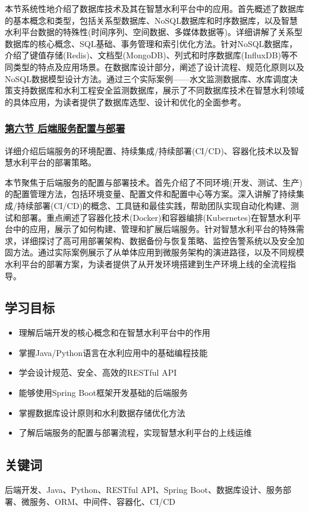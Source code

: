 本节系统性地介绍了数据库技术及其在智慧水利平台中的应用。首先概述了数据库的基本概念和类型，包括关系型数据库、NoSQL数据库和时序数据库，以及智慧水利平台数据的特殊性(时间序列、空间数据、多媒体数据等)。详细讲解了关系型数据库的核心概念、SQL基础、事务管理和索引优化方法。针对NoSQL数据库，介绍了键值存储(Redis)、文档型(MongoDB)、列式和时序数据库(InfluxDB)等不同类型的特点及应用场景。在数据库设计部分，阐述了设计流程、规范化原则以及NoSQL数据模型设计方法。通过三个实际案例------水文监测数据库、水库调度决策支持数据库和水利工程安全监测数据库，展示了不同数据库技术在智慧水利领域的具体应用，为读者提供了数据库选型、设计和优化的全面参考。

\subsubsection{\texorpdfstring{\href{section05-06.md}{第六节
后端服务配置与部署}}{第六节 后端服务配置与部署}}\label{ux7b2cux516dux8282-ux540eux7aefux670dux52a1ux914dux7f6eux4e0eux90e8ux7f72}

详细介绍后端服务的环境配置、持续集成/持续部署(CI/CD)、容器化技术以及智慧水利平台的部署策略。

本节聚焦于后端服务的配置与部署技术。首先介绍了不同环境(开发、测试、生产)的配置管理方法，包括环境变量、配置文件和配置中心等方案。深入讲解了持续集成/持续部署(CI/CD)的概念、工具链和最佳实践，帮助团队实现自动化构建、测试和部署。重点阐述了容器化技术(Docker)和容器编排(Kubernetes)在智慧水利平台中的应用，展示了如何构建、管理和扩展后端服务。针对智慧水利平台的特殊需求，详细探讨了高可用部署架构、数据备份与恢复策略、监控告警系统以及安全加固方法。通过实际案例展示了从单体应用到微服务架构的演进路径，以及不同规模水利平台的部署方案，为读者提供了从开发环境搭建到生产环境上线的全流程指导。

\subsection{学习目标}\label{ux5b66ux4e60ux76eeux6807}

\begin{itemize}
\tightlist
\item
  理解后端开发的核心概念和在智慧水利平台中的作用
\item
  掌握Java/Python语言在水利应用中的基础编程技能
\item
  学会设计规范、安全、高效的RESTful API
\item
  能够使用Spring Boot框架开发基础的后端服务
\item
  掌握数据库设计原则和水利数据存储优化方法
\item
  了解后端服务的配置与部署流程，实现智慧水利平台的上线运维
\end{itemize}

\subsection{关键词}\label{ux5173ux952eux8bcd}

后端开发、Java、Python、RESTful API、Spring
Boot、数据库设计、服务部署、微服务、ORM、中间件、容器化、CI/CD
